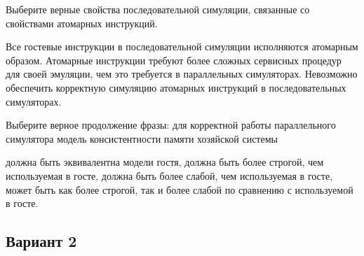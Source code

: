 \begin{questions}
\question[3] Выберите верные свойства последовательной симуляции, связанные со свойствами атомарных инструкций.
\begin{choices}
    \correctchoice Все гостевые инструкции в последовательной симуляции исполняются атомарным образом.
    \choice Атомарные инструкции требуют более сложных сервисных процедур для своей эмуляции, чем это требуется в параллельных симуляторах.
    \choice Невозможно обеспечить корректную симуляцию атомарных инструкций в последовательных симуляторах.
\end{choices}

\question[3] Выберите верное продолжение фразы: для корректной работы параллельного симулятора модель консистентности памяти хозяйской системы 
\begin{choices}
    \choice должна быть эквивалентна модели гостя,
    \correctchoice должна быть более строгой, чем используемая в госте,
    \choice должна быть более слабой, чем используемая в госте,
    \choice может быть как более строгой, так и более слабой по сравнению с используемой в госте.
\end{choices}





\end{questions}

\subsection*{Вариант 2}

